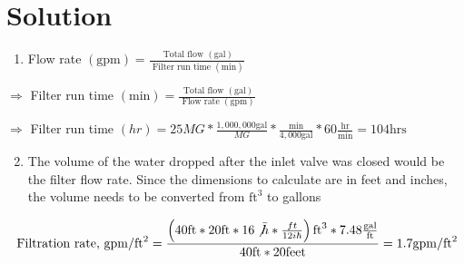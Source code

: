 \documentclass[10pt]{article}
\begin{document}
\begin{enumerate}
\begin{enumerate}
\begin{enumerate}
\end{enumerate}

\section{Solution}
\begin{enumerate}
  \item Flow rate $(\mathrm{gpm})=\frac{\text { Total flow }(\mathrm{gal})}{\text { Filter run time }(\mathrm{min})}$
\end{enumerate}

$\Longrightarrow$ Filter run time $(\mathrm{min})=\frac{\text { Total flow }(\mathrm{gal})}{\text { Flow rate }(\mathrm{gpm})}$

$\Longrightarrow$ Filter run time $(h r)=25 M G * \frac{1,000,000 \mathrm{gal}}{M G} * \frac{\mathrm{min}}{4,000 \mathrm{gal}} * 60 \frac{\mathrm{hr}}{\mathrm{min}}=104 \mathrm{hrs}$

\begin{enumerate}
  \setcounter{enumi}{1}
  \item The volume of the water dropped after the inlet valve was closed would be the filter flow rate. Since the dimensions to calculate are in feet and inches, the volume needs to be converted from $\mathrm{ft}^{3}$ to gallons
\end{enumerate}

$$
\text { Filtration rate, } \mathrm{gpm} / \mathrm{ft}^{2}=\frac{\left(40 \mathrm{ft} * 20 \mathrm{ft} * 16 \not \bar{h} * \frac{f t}{12 i \hbar}\right) \mathrm{ft}^{3} * 7.48 \frac{\mathrm{gal}}{\mathrm{ft}}}{40 \mathrm{ft} * 20 \mathrm{feet}}=1.7 \mathrm{gpm} / \mathrm{ft}^{2}
$$
\end{document}
